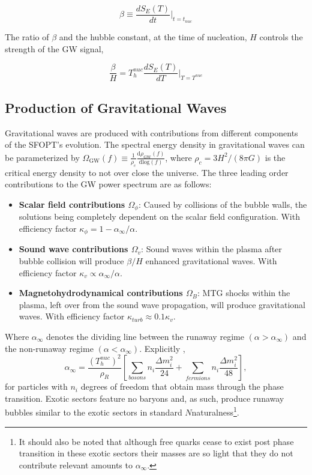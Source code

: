 \documentclass[nofootinbib,twocolumn,preprintnumbers]{revtex4-1}
\begin{document}
\begin{equation}
\beta  \equiv \frac{dS_{E}(T)}{dt}\bigg|_{t = t_{nuc}}
\end{equation}

The ratio of $\beta$ and the hubble constant, at the time of nucleation, $H$ controls the strength of the GW signal,

\begin{equation}
\frac{\beta}{H} = T^{nuc}_h \frac{dS_{E}(T)}{dT}\bigg|_{T = T^{nuc}}
\end{equation}



\subsection{Production of Gravitational Waves}
\label{sec:signals}

Gravitational waves are produced with contributions from different components of the SFOPT's evolution.  The spectral energy density in gravitational waves can be parameterized by $\Omega_{\textrm{GW}} (f) \equiv \frac{1}{ \rho_{c}} \frac{\textrm{d} \rho_{\textrm{GW}}(f) }{\textrm{dlog}(f)}$, where $\rho_{c} = 3H^2/(8 \pi G)$ is the critical energy density to not over close the universe. The three leading order contributions to the GW power spectrum are as follows:
\begin{itemize}
\item \textbf{Scalar field contributions $\Omega_{\phi}$}: Caused by collisions of the bubble walls, the solutions being completely dependent on the scalar field configuration. With efficiency factor $\kappa_{\phi} = 1 - \alpha_{\infty}/\alpha$. 
\item \textbf{Sound wave contributions $\Omega_{v}$}: Sound waves within the plasma after bubble collision will produce $\beta/H$ enhanced gravitational waves. With efficiency factor $\kappa_{v} \propto \alpha_{\infty}/\alpha$.
\item \textbf{Magnetohydrodynamical contributions $\Omega_{B}$}: MTG shocks within the plasma, left over from the sound wave propagation, will produce gravitational waves. With efficiency factor $\kappa_{
turb} \approx 0.1 \kappa_{v} $.
\end{itemize}


Where $\alpha_{\infty}$ denotes the dividing line between the runaway regime  $(\alpha >\alpha_{\infty})$ and the non-runaway regime $(\alpha <\alpha_{\infty})$. Explicitly \cite{Breitbach:2018ddu, Caprini:2015zlo, Espinosa:2010hh}, 
\begin{equation}\label{eqn:critPTstrength}
\alpha_{\infty} = \frac{(T^{nuc}_h)^2}{\rho_R}\left[\sum_{bosons} n_i\frac{\Delta m^2_i}{24} + \sum_{fermions} n_i\frac{\Delta m_i^2}{48}\right],
\end{equation} 
for particles with $n_i$ degrees of freedom that obtain mass through the phase transition. 
Exotic sectors feature no baryons and, as such, produce runaway bubbles similar to the exotic sectors in standard $N$naturalness\footnote {It should also be noted that although free quarks cease to exist post phase transition in these exotic sectors their masses are so light that they do not contribute relevant amounts to $\alpha_{\infty}$.}. 
\end{document}
